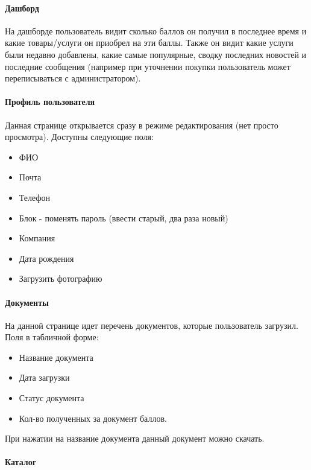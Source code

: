 \documentclass[DIV=calc, paper=a4, fontsize=11pt]{scrartcl} %
\begin{document}
\paragraph{Дашборд}

На дашборде пользователь видит сколько баллов он получил в последнее время и какие товары/услуги он приобрел на эти баллы. Также он видит какие услуги были недавно добавлены, какие самые популярные, сводку последних новостей и последние сообщения (например при уточнении покупки пользователь может переписываться с администратором).

\paragraph{Профиль пользователя}

Данная странице открывается сразу в режиме редактирования (нет просто просмотра). Доступны следующие поля:

\begin{itemize}
	\item ФИО
	\item Почта
	\item Телефон
	\item Блок - поменять пароль (ввести старый, два раза новый)
	\item Компания
	\item Дата рождения
	\item Загрузить фотографию
\end{itemize}

\paragraph{Документы}

На данной странице идет перечень документов, которые пользователь загрузил. Поля в табличной форме:

\begin{itemize}
	\item Название документа
	\item Дата загрузки
	\item Статус документа
	\item Кол-во полученных за документ баллов.
\end{itemize}

При нажатии на название документа данный документ можно скачать.

\paragraph{Каталог}
\end{document}
